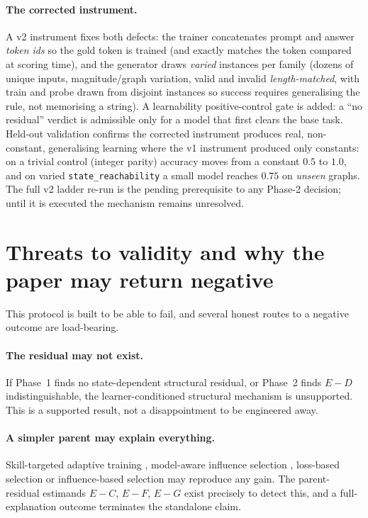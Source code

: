 \documentclass[11pt]{article}
\begin{document}
\paragraph{The corrected instrument.} A v2 instrument fixes both defects: the trainer concatenates prompt and answer \emph{token ids} so the gold token is trained (and exactly matches the token compared at scoring time), and the generator draws \emph{varied} instances per family (dozens of unique inputs, magnitude/graph variation, valid and invalid \emph{length-matched}, with train and probe drawn from disjoint instances so success requires generalising the rule, not memorising a string). A learnability positive-control gate is added: a ``no residual'' verdict is admissible only for a model that first clears the base task. Held-out validation confirms the corrected instrument produces real, non-constant, generalising learning where the v1 instrument produced only constants: on a trivial control (integer parity) accuracy moves from a constant $0.5$ to $1.0$, and on varied \texttt{state\_reachability} a small model reaches $0.75$ on \emph{unseen} graphs. The full v2 ladder re-run is the pending prerequisite to any Phase-2 decision; until it is executed the mechanism remains unresolved.

\section{Threats to validity and why the paper may return negative}
\label{sec:threats}

This protocol is built to be able to fail, and several honest routes to a negative outcome are load-bearing.

\paragraph{The residual may not exist.} If Phase~1 finds no state-dependent structural residual, or Phase~2 finds $E-D$ indistinguishable, the learner-conditioned structural mechanism is unsupported. This is a supported result, not a disappointment to be engineered away.

\paragraph{A simpler parent may explain everything.} Skill-targeted adaptive training \cite{he2026stat}, model-aware influence selection \cite{yu2024mates}, loss-based selection \cite{lin2024rho1} or influence-based selection \cite{xia2024less} may reproduce any gain. The parent-residual estimands $E-C$, $E-F$, $E-G$ exist precisely to detect this, and a full-explanation outcome terminates the standalone claim.
\end{document}
